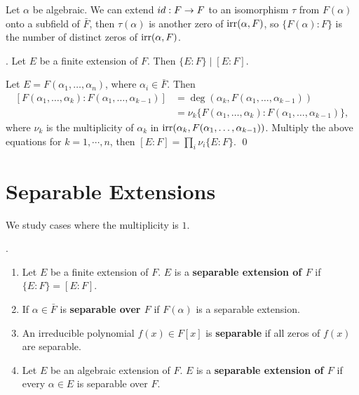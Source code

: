 \rmk Let \(\alpha\) be algebraic. We can extend \(id : F \rightarrow F\) to an isomorphism \(\tau\) from \(F(\alpha)\) onto a subfield of \(\bar{F}\), then \(\tau(\alpha)\) is another zero of \(\mathrm{irr}(\alpha, F)\), so \(\{F(\alpha) : F\}\) is the number of distinct zeros of \(\mathrm{irr}(\alpha, F)\).

\thm. Let \(E\) be a finite extension of \(F\). Then \(\{E : F\} \mid [E : F]\).


\pf Let \(E = F(\alpha_1, \dots, \alpha_n)\), where \(\alpha_i \in \bar{F}\). Then
\[
    \begin{aligned}
        [F(\alpha_1, \dots, \alpha_k) : F(\alpha_1, \dots, \alpha_{k-1})] & = \deg(\alpha_k, F(\alpha_1, \dots, \alpha_{k-1}))                          \\
                                                                          & = \nu_k \{F(\alpha_1, \dots, \alpha_k) : F(\alpha_1, \dots, \alpha_{k-1})\},
    \end{aligned}
\]
where \(\nu_k\) is the multiplicity of \(\alpha_k\) in \(\mathrm{irr}(\alpha_k, F(\alpha_1, \dots, \alpha_{k-1}))\). Multiply the above equations for \(k = 1, \cdots, n\), then \([E : F] = \prod_i \nu_i \{E : F\}\). \qed

\section*{Separable Extensions}

We study cases where the multiplicity is \(1\).

. 
\begin{enumerate}
    \item Let \(E\) be a finite extension of \(F\). \(E\) is a \textbf{separable extension of \(F\)} if \(\{E : F\} = [E : F]\).
    \item If \(\alpha \in \bar{F}\) is \textbf{separable over \(F\)} if \(F(\alpha)\) is a separable extension.
    \item An irreducible polynomial \(f(x) \in F[x]\) is \textbf{separable} if all zeros of \(f(x)\) are separable.
    \item Let \(E\) be an algebraic extension of \(F\). \(E\) is a \textbf{separable extension of \(F\)} if every \(\alpha \in E\) is separable over \(F\).
\end{enumerate}

